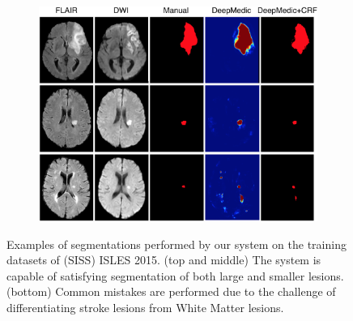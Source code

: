 \begin{figure}[!h]
\centering
\begin{subfigure}[b]{1.0\textwidth}
	\centering
	\includegraphics[clip=true, trim=0pt 0pt 0pt 0pt, width=1.0\textwidth]{figures/evaluationSection/isles/qualitative/isles15TrainingQualitatively.png}
\end{subfigure}
\vspace{-0pt} %
\caption{Examples of segmentations performed by our system on the training datasets of (SISS) ISLES 2015. (top and middle) The system is capable of satisfying segmentation of both large and smaller lesions. (bottom) Common mistakes are performed due to the challenge of differentiating stroke lesions from White Matter lesions. }
\label{fig:evalIslesVisualQuality}
\end{figure}
